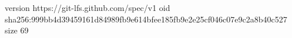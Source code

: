 version https://git-lfs.github.com/spec/v1
oid sha256:999bb4d39459161d84989fb9e614bfee185fb9e2e25cf046c07e9c2a8b40c527
size 69
